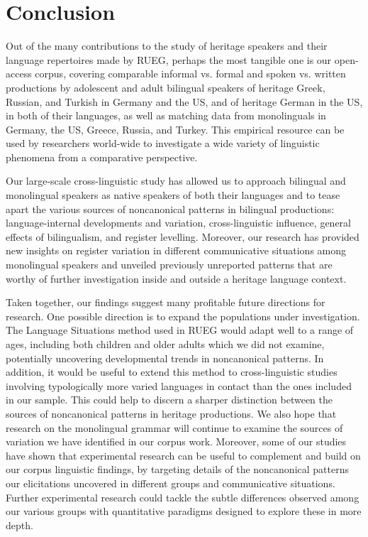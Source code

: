 \documentclass[output=paper,colorlinks,citecolor=brown]{langscibook}
\begin{document}

\section{Conclusion} \label{sec:introwieseetal:conclusion}

Out of the many contributions to the study of heritage speakers and their language repertoires made by RUEG, perhaps the most tangible one is our open-access corpus, covering comparable informal vs. formal and spoken vs. written productions by adolescent and adult bilingual speakers of heritage Greek, Russian, and Turkish in Germany and the US, and of heritage German in the US, in both of their languages, as well as matching data from monolinguals in Germany, the US, Greece, Russia, and Turkey. This empirical resource can be used by researchers world-wide to investigate a wide variety of linguistic phenomena from a comparative perspective.

Our large-scale cross-linguistic study has allowed us to approach bilingual and monolingual speakers as native speakers of both their languages and to tease apart the various sources of noncanonical patterns in bilingual productions: language-internal developments and variation, cross-linguistic influence, general effects of bilingualism, and register levelling. Moreover, our research has provided new insights on register variation in different communicative situations among monolingual speakers and unveiled previously unreported patterns that are worthy of further investigation inside and outside a heritage language context.

Taken together, our findings suggest many profitable future directions for research. One possible direction is to expand the populations under investigation. The Language Situations method used in RUEG would adapt well to a range of ages, including both children and older adults which we did not examine, potentially uncovering developmental trends in noncanonical patterns. In addition, it would be useful to extend this method to cross-linguistic studies involving typologically more varied languages in contact than the ones included in our sample. This could help to discern a sharper distinction between the sources of noncanonical patterns in heritage productions. We also hope that research on the monolingual grammar will continue to examine the sources of variation we have identified in our corpus work. Moreover, some of our studies have shown that experimental research can be useful to complement and build on our corpus linguistic findings, by targeting details of the noncanonical patterns our elicitations uncovered in different groups and communicative situations. Further experimental research could tackle the subtle differences observed among our various groups with quantitative paradigms designed to explore these in more depth.
\end{document}
